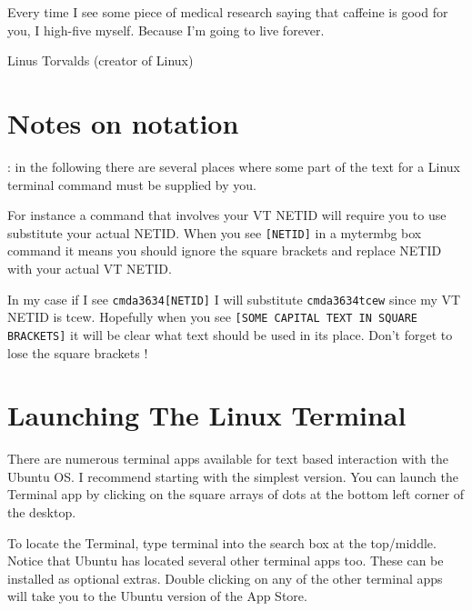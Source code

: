 
\epigraph{Every time I see some piece of medical research saying that caffeine is good for you, I high-five myself. Because I'm going to live forever.}{Linus Torvalds (creator of Linux)}

\minitoc

\section{Notes on notation}

\vspace{8pt}: in the following there are several places where some part of the text for a Linux terminal command must be supplied by you. 

For instance a command that involves your VT NETID will require you to use substitute your actual NETID. When you see \texttt{[NETID]} in a mytermbg box command it means you should ignore the square brackets and replace NETID with your actual VT NETID.

In my case if I  see \texttt{cmda3634[NETID]} I will substitute \texttt{cmda3634tcew} since my VT NETID is tcew. 
Hopefully when you see \texttt{[SOME CAPITAL TEXT IN SQUARE BRACKETS]} it will be clear what text should be used in its place. Don't forget to lose the square brackets !

\section{Launching The Linux Terminal}

There are numerous terminal apps available for text based interaction with the Ubuntu OS. I recommend starting with the simplest version. You can launch the Terminal app by clicking on the square arrays of dots at the bottom left corner of the desktop.


To locate the Terminal, type terminal into the search box at the top/middle. Notice that Ubuntu has located several other terminal apps too. These can be installed as optional extras. Double clicking on any of the other terminal apps will take you to the Ubuntu version of the App Store.


